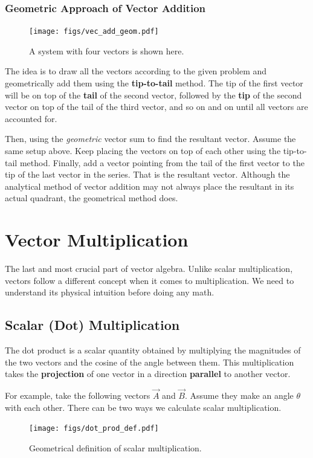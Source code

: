 \documentclass[12pt,b4paper]{article}
\begin{document}
\subsubsection*{Geometric Approach of Vector Addition}
\begin{figure}[H]
    \centering
    \texttt{[image: figs/vec\_add\_geom.pdf]}
    \caption{A system with four vectors is shown here.}
    \label{fig:vec_add_gem}
\end{figure}
The idea is to draw all the vectors according to the given problem and geometrically add them using the \textbf{tip-to-tail} method. The tip of the first vector will be on top of the \textbf{tail} of the second vector, followed by the \textbf{tip} of the second vector on top of the tail of the third vector, and so on and on until all vectors are accounted for.

Then, using the \textit{geometric} vector sum to find the resultant vector.
\thispagestyle{empty}
Assume the same setup above. Keep placing the vectors on top of each other using the tip-to-tail method. Finally, add a vector pointing from the tail of the first vector to the tip of the last vector in the series. That is the resultant vector. Although the analytical method of vector addition may not always place the resultant in its actual quadrant, the geometrical method does.
\thispagestyle{empty}
\section*{Vector Multiplication}
The last and most crucial part of vector algebra. Unlike scalar multiplication, vectors follow a different concept when it comes to multiplication. We need to understand its physical intuition before doing any math.
\subsection*{Scalar (Dot) Multiplication}
The dot product is a scalar quantity obtained by multiplying the magnitudes of the two vectors and the cosine of the angle between them. This multiplication takes the \textbf{projection} of one vector in a direction \textbf{parallel} to another vector.

For example, take the following vectors $\Vec{A}$ and $\Vec{B}$. Assume they make an angle $\theta$ with each other. There can be two ways we calculate scalar multiplication.
\begin{figure}[H]
    \centering
    \texttt{[image: figs/dot\_prod\_def.pdf]}
    \caption{Geometrical definition of scalar multiplication.}
    \label{fig:dot_prod_def}
\end{figure}
\end{document}
